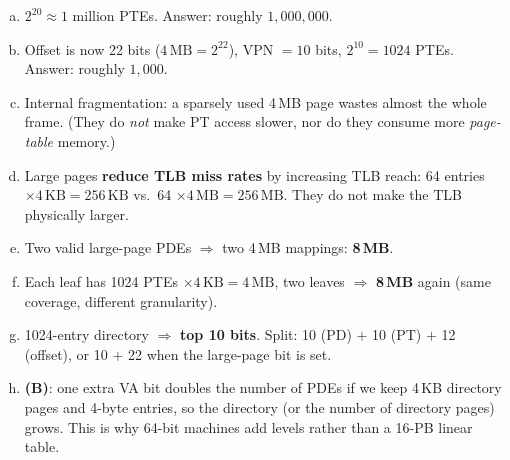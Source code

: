 \documentclass[11pt,a4paper]{article}
\newenvironment{Sol}{%
  \begin{tcolorbox}[sboxstyle, title={Solution}]%
}{%
  \end{tcolorbox}\vspace{0.35em}%
}
\begin{document}
\begin{Sol}
\begin{enumerate}[(a)]
\item $2^{20}\approx 1$ million PTEs. Answer: roughly $1{,}000{,}000$.
\item Offset is now 22 bits ($4\,\mathrm{MB}=2^{22}$), VPN $=10$ bits,
      $2^{10}=1024$ PTEs. Answer: roughly $1{,}000$.
\item Internal fragmentation: a sparsely used 4\,MB page wastes almost
      the whole frame. (They do \emph{not} make PT access slower, nor
      do they consume more \emph{page-table} memory.)
\item Large pages \textbf{reduce TLB miss rates} by increasing TLB
      reach: 64 entries $\times 4\,\mathrm{KB} = 256\,\mathrm{KB}$ vs.\
      64 $\times 4\,\mathrm{MB} = 256\,\mathrm{MB}$. They do not make
      the TLB physically larger.
\item Two valid large-page PDEs $\Rightarrow$ two 4\,MB mappings:
      \textbf{8\,MB}.
\item Each leaf has 1024 PTEs $\times 4\,\mathrm{KB} = 4\,\mathrm{MB}$,
      two leaves $\Rightarrow$ \textbf{8\,MB} again (same coverage,
      different granularity).
\item 1024-entry directory $\Rightarrow$ \textbf{top 10 bits}.
      Split: 10 (PD) $+$ 10 (PT) $+$ 12 (offset), or 10 $+$ 22 when the
      large-page bit is set.
\item \textbf{(B)}: one extra VA bit doubles the number of PDEs if we
      keep 4\,KB directory pages and 4-byte entries, so the directory
      (or the number of directory pages) grows. This is why 64-bit
      machines add levels rather than a 16-PB linear table.
\end{enumerate}
\end{Sol}
\end{document}

